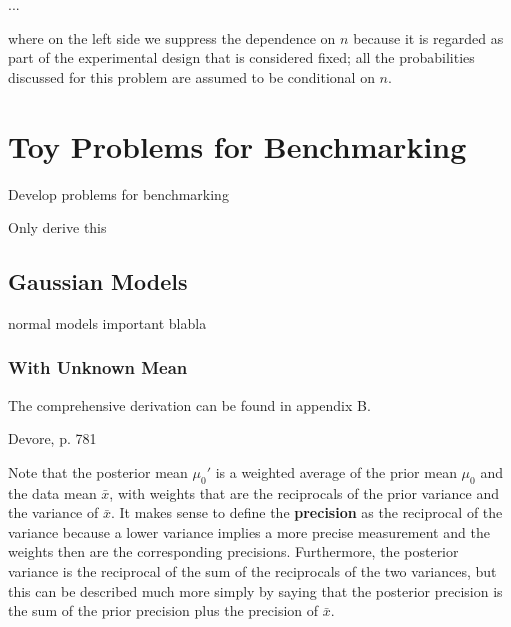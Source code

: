 ...

where on the left side we suppress the dependence on $n$ because it is regarded as part of the experimental design that is considered fixed; all the probabilities discussed for this problem are assumed to be conditional on $n$.



\section{Toy Problems for Benchmarking}\label{sec:toy_problems}

Develop problems for benchmarking



Only derive this

\subsection{Gaussian Models}\label{sec:gaussian_models}

normal models important blabla

\subsubsection{With Unknown Mean}

The comprehensive derivation can be found in appendix B. 

Devore, p. 781 

Note that the posterior mean $\mu_0'$ is a weighted average of the prior mean $\mu_0$ and the data mean $\bar{x}$, with weights that are the reciprocals of the prior variance and the variance of $\bar{x}$. It makes sense to define the \textbf{precision} as the reciprocal of the variance because a lower variance implies a more precise measurement and the weights then are the corresponding precisions. Furthermore, the posterior variance is the reciprocal of the sum of the reciprocals of the two variances, but this can be described much more simply by saying that the posterior precision is the sum of the prior precision plus the precision of $\bar{x}$. 

